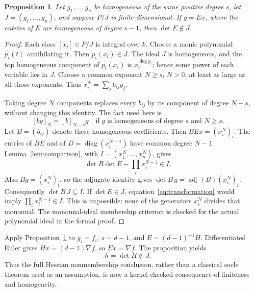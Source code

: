 \documentclass[11pt,letterpaper]{article}
\newtheorem{proposition}[theorem]{Proposition}
\DeclareMathOperator{\adj}{adj}
\begin{document}
\begin{proposition}\label{prop:detector}
Let \(g_1,\ldots,g_n\) be homogeneous of the same positive degree \(s\),
let \(J=(g_1,\ldots,g_n)\), and suppose \(P/J\) is finite-dimensional.
If \(g=Ex\), where the entries of \(E\) are homogeneous of degree \(s-1\),
then \(\det E\notin J\).
\end{proposition}
\begin{proof}
Each class \([x_i]\in P/J\) is integral over \(k\). Choose a monic polynomial
\(p_i(t)\) annihilating it. Then \(p_i(x_i)\in J\). The ideal \(J\) is
homogeneous, and the top homogeneous component of \(p_i(x_i)\) is
\(x_i^{\deg p_i}\); hence some power of each variable lies in \(J\).
Choose a common exponent \(N\ge s\), \(N>0\), at least as large as all those
exponents. Thus \(x_i^N=\sum_j b_{ij}g_j\).

Taking degree \(N\) components replaces every \(b_{ij}\) by its component of
degree \(N-s\), without changing this identity. The fact used here is
\[
 [bg]_N=[b]_{N-s}g\quad\text{if }g\text{ is homogeneous of degree }s
 \text{ and }N\ge s.
\]
Let \(B=(b_{ij})\) denote these homogeneous coefficients. Then
\(BEx=(x_i^N)_i\). The entries of \(BE\) and of
\(D=\operatorname{diag}(x_i^{N-1})\) have common degree \(N-1\).
Lemma~\ref{lem:comparison}, with \(I=(x_1^N,\ldots,x_n^N)\), gives
\begin{equation}\label{eq:transformation}
 \det B\det E-\prod_i x_i^{N-1}\in I.
\end{equation}
Also \(Bg=(x_i^N)_i\), so the adjugate identity gives
\(\det B\,g=\adj(B)(x_i^N)_i\). Consequently \(\det B\,J\subseteq I\).
If \(\det E\in J\), equation~\eqref{eq:transformation} would imply
\(\prod_i x_i^{N-1}\in I\). This is impossible: none of the generators
\(x_i^N\) divides that monomial. The monomial-ideal membership criterion
is checked for the actual polynomial ideal in the formal proof.
\end{proof}

Apply Proposition~\ref{prop:detector} to \(g_i=f_i\), \(s=d-1\), and
\(E=(d-1)^{-1}H\). Differentiated Euler gives \(Hx=(d-1)\nabla f\), so
\(Ex=\nabla f\). The proposition yields
\begin{equation}\label{eq:hessian}
 h=\det H\notin J.
\end{equation}
Thus the full Hessian nonmembership conclusion, rather than a classical socle
theorem used as an assumption, is now a kernel-checked consequence of finiteness
and homogeneity.
\end{document}
